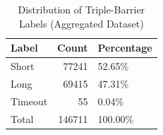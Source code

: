 \begin{table}[h]
\centering
\caption{Distribution of Triple-Barrier Labels (Aggregated Dataset)}
\label{tab:label_dist}
\begin{tabular}{lrl}
\toprule
Label & Count & Percentage \\
\midrule
Short & 77241 & 52.65\% \\
Long & 69415 & 47.31\% \\
Timeout & 55 & 0.04\% \\
Total & 146711 & 100.00\% \\
\bottomrule
\end{tabular}
\end{table}
